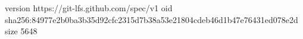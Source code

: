 version https://git-lfs.github.com/spec/v1
oid sha256:84977e2b0ba3b35d92cfc2315d7b38a53e21804cdeb46d1b47e76431ed078e2d
size 5648
